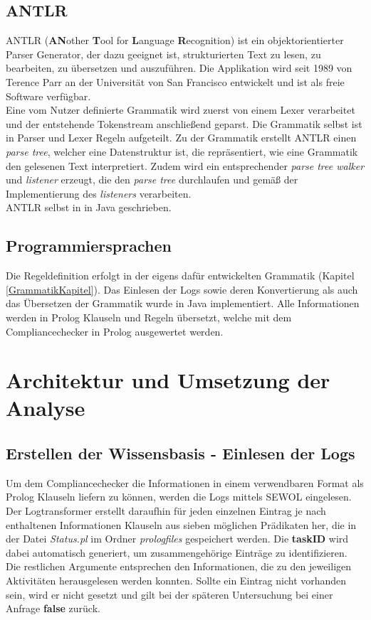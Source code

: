 \subsection{ANTLR}
ANTLR (\textbf{AN}other \textbf{T}ool for \textbf{L}anguage \textbf{R}ecognition) ist ein objektorientierter Parser Generator, der dazu geeignet ist, strukturierten Text zu lesen, zu bearbeiten, zu übersetzen und auszuführen. Die Applikation wird seit 1989 von Terence Parr an der Universität von San Francisco entwickelt und ist als freie Software verfügbar.\\
Eine vom Nutzer definierte Grammatik wird zuerst von einem Lexer verarbeitet und der entstehende Tokenstream anschließend geparst. Die Grammatik selbst ist in Parser und Lexer Regeln aufgeteilt. Zu der Grammatik erstellt ANTLR einen \textit{parse tree}, welcher eine Datenstruktur ist, die repräsentiert, wie eine Grammatik den gelesenen Text interpretiert. Zudem wird ein entsprechender \textit{parse tree walker} und \textit{listener} erzeugt, die den \textit{parse tree} durchlaufen und gemäß der Implementierung des \textit{listeners} verarbeiten.\\
ANTLR selbst in in Java geschrieben.\cite{antlr}
\subsection{Programmiersprachen} 
Die Regeldefinition erfolgt in der eigens dafür entwickelten Grammatik (Kapitel \ref{GrammatikKapitel}). Das Einlesen der Logs sowie deren Konvertierung als auch das Übersetzen der Grammatik wurde in Java implementiert. Alle Informationen werden in Prolog Klauseln und Regeln übersetzt, welche mit dem Compliancechecker in Prolog ausgewertet werden.

%
%
\section{Architektur und Umsetzung der Analyse}
\subsection{Erstellen der Wissensbasis - Einlesen der Logs}
\label{sec:logtransformer}
Um dem Compliancechecker die Informationen in einem verwendbaren Format als Prolog Klauseln liefern zu können, werden die Logs mittels SEWOL eingelesen. Der Logtransformer erstellt daraufhin für jeden einzelnen Eintrag je nach enthaltenen Informationen Klauseln aus sieben möglichen Prädikaten her, die in der Datei \textit{Status.pl} im Ordner \textit{prologfiles} gespeichert werden. 
Die \textbf{taskID} wird dabei automatisch generiert, um zusammengehörige Einträge zu identifizieren. Die restlichen Argumente entsprechen den Informationen, die zu den jeweiligen Aktivitäten herausgelesen werden konnten. Sollte ein Eintrag nicht vorhanden sein, wird er nicht gesetzt und gilt bei der späteren Untersuchung bei einer Anfrage \textbf{false} zurück.


